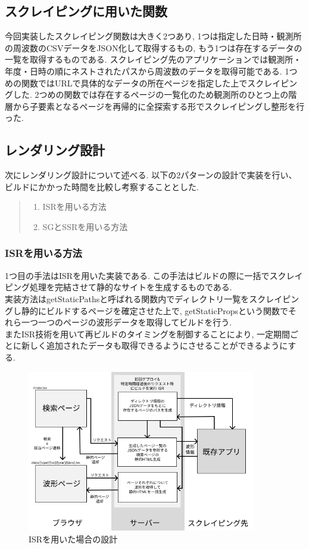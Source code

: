 \subsection{スクレイピングに用いた関数}
今回実装したスクレイピング関数は大きく2つあり, 1つは指定した日時・観測所の周波数のCSVデータをJSON化して取得するもの, もう1つは存在するデータの一覧を取得するものである.
スクレイピング先のアプリケーションでは観測所・年度・日時の順にネストされたパスから周波数のデータを取得可能である. 
1つめの関数ではURLで具体的なデータの所在ページを指定した上でスクレイピングした.
2つめの関数では存在するページの一覧化のため観測所のひとつ上の階層から子要素となるページを再帰的に全探索する形でスクレイピングし整形を行った.

\subsection{レンダリング設計}
次にレンダリング設計について述べる.
以下の2パターンの設計で実装を行い、ビルドにかかった時間を比較し考察することとした.
\begin{quote}
	\begin{enumerate}
		\item ISRを用いる方法
		\item SGとSSRを用いる方法
	\end{enumerate}
\end{quote}
\subsubsection{ISRを用いる方法}
1つ目の手法はISRを用いた実装である.
この手法はビルドの際に一括でスクレイピング処理を完結させて静的なサイトを生成するものである.\\
実装方法はgetStaticPathsと呼ばれる関数内でディレクトリ一覧をスクレイピングし静的にビルドするページを確定させた上で, getStaticPropsという関数でそれら一つ一つのページの波形データを取得してビルドを行う.\\
またISR技術を用いて再ビルドのタイミングを制御することにより, 一定期間ごとに新しく追加されたデータも取得できるようにさせることができるようにする.

\begin{figure}[htbp]
	\begin{center}
		\includegraphics[width=100mm]{./images/app/ISRver.png}
		\caption{ISRを用いた場合の設計}\label{fig:ISR-arc}
	\end{center}
\end{figure}


